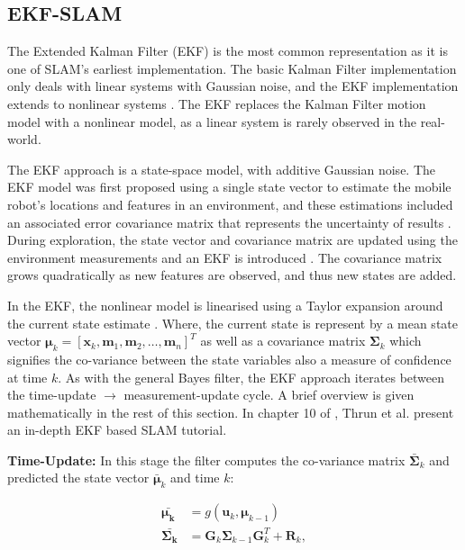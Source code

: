 \subsection{EKF-SLAM}
\label{subsec:ekf-slam}
The Extended Kalman Filter (EKF) is the most common representation as it is one of SLAM's earliest implementation. The basic Kalman Filter implementation only deals with linear systems with Gaussian noise, and the EKF implementation extends to nonlinear systems \cite{Li2012}. The EKF replaces the Kalman Filter motion model with a nonlinear model, as a linear system is rarely observed in the real-world. 

The EKF approach is a state-space model, with additive Gaussian noise. The EKF model was first proposed using a single state vector to estimate the mobile robot's locations and features in an environment, and these estimations included an associated error covariance matrix that represents the uncertainty of results \cite{Chen2013}. During exploration, the state vector and covariance matrix are updated using the environment measurements and an EKF is introduced \cite{Bailey2006b}. The covariance matrix grows quadratically as new features are observed, and thus new states are added.

In the EKF, the nonlinear model is linearised using a Taylor expansion around the current state estimate \cite{Kurt-Yavuz2012}. Where, the current state is represent by a mean state vector $\mathbf{\mu}_k = [\mathbf{x}_k, \mathbf{m}_1, \mathbf{m}_2, \dots{}, \mathbf{m}_n]^T $ as well as a covariance matrix $\mathbf{\Sigma}_k$ which signifies the co-variance between the state variables also a measure of confidence at time $k$. As with the general Bayes filter, the EKF approach iterates between the time-update $\rightarrow$ measurement-update cycle. A brief overview is given mathematically in the rest of this section. In chapter 10 of \cite{Thrun2006}, Thrun et al. present an in-depth EKF based SLAM tutorial.

\textbf{Time-Update:} In this stage the filter computes the co-variance matrix $\bar{\mathbf{\Sigma}}_k$ and predicted the state vector $\bar{\mathbf{\mu}}_k$ and time $k$:

\begin{equation}
\begin{split}
    \mathbf{\bar{\mu_k}} &= g(\mathbf{u}_k, \mathbf{\mu}_{k-1})\\
	\mathbf{\bar{\Sigma_k}} &= \mathbf{G}_k \mathbf{\Sigma}_{k-1} \mathbf{G}^{T}_{k} + \mathbf{R}_k,
\end{split}
	\label{eq:ekf:time}
\end{equation}

